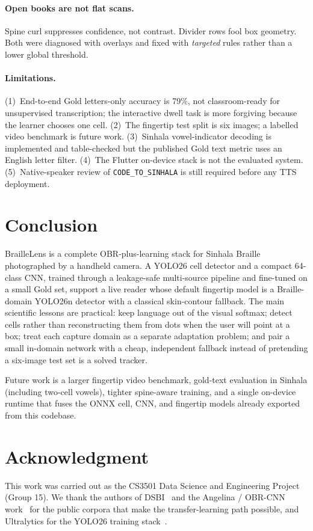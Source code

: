 \documentclass[conference]{IEEEtran}
\begin{document}
\paragraph{Open books are not flat scans.}
Spine curl suppresses confidence, not contrast. Divider rows fool box
geometry. Both were diagnosed with overlays and fixed with
\textit{targeted} rules rather than a lower global threshold.

\paragraph{Limitations.}
(1)~End-to-end Gold letters-only accuracy is 79\%, not classroom-ready
for unsupervised transcription; the interactive dwell task is more
forgiving because the learner chooses one cell. (2)~The fingertip test
split is six images; a labelled video benchmark is future work.
(3)~Sinhala vowel-indicator decoding is implemented and table-checked
but the published Gold text metric uses an English letter filter.
(4)~The Flutter on-device stack is not the evaluated system.
(5)~Native-speaker review of \texttt{CODE\_TO\_SINHALA} is still required
before any TTS deployment.

\section{Conclusion}
\label{sec:conc}

BrailleLens is a complete OBR-plus-learning stack for Sinhala Braille
photographed by a handheld camera. A YOLO26 cell detector and a compact
64-class CNN, trained through a leakage-safe multi-source pipeline and
fine-tuned on a small Gold set, support a live reader whose default
fingertip model is a Braille-domain YOLO26n detector with a classical
skin-contour fallback. The main scientific lessons are practical:
keep language out of the visual softmax; detect cells rather than
reconstructing them from dots when the user will point at a box; treat
each capture domain as a separate adaptation problem; and pair a small
in-domain network with a cheap, independent fallback instead of
pretending a six-image test set is a solved tracker.

Future work is a larger fingertip video benchmark, gold-text evaluation
in Sinhala (including two-cell vowels), tighter spine-aware training,
and a single on-device runtime that fuses the ONNX cell, CNN, and
fingertip models already exported from this codebase.

\section*{Acknowledgment}
This work was carried out as the CS3501 Data Science and Engineering
Project (Group 15). We thank the authors of DSBI~\cite{li2018dsbi} and
the Angelina / OBR-CNN work~\cite{ovodov2021obr} for the public corpora
that make the transfer-learning path possible, and Ultralytics for the
YOLO26 training stack~\cite{yolo-ultralytics}.
\end{document}
